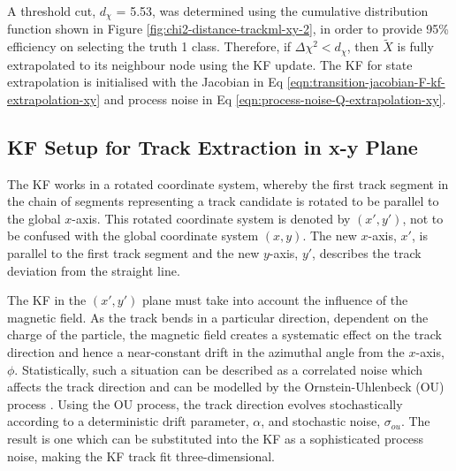 A threshold cut, $d_{\chi}$ = 5.53, was determined using the cumulative distribution function shown in Figure \ref{fig:chi2-distance-trackml-xy-2}, in order to provide 95\% efficiency on selecting the truth 1 class. Therefore, if $\Delta \chi^{2} < d_{\chi}$, then $\tilde{X}$ is fully extrapolated to its neighbour node using the KF update. The KF for state extrapolation is initialised with the Jacobian in Eq \eqref{eqn:transition-jacobian-F-kf-extrapolation-xy} and process noise in Eq \eqref{eqn:process-noise-Q-extrapolation-xy}.









\clearpage
\subsection{KF Setup for Track Extraction in x-y Plane}
\label{chapter-6-derivation-part-2}

The KF works in a rotated coordinate system, whereby the first track segment in the chain of segments representing a track candidate is rotated to be parallel to the global $x$-axis. This rotated coordinate system is denoted by $(x', y')$, not to be confused with the global coordinate system $(x, y)$. The new $x$-axis, $x'$, is parallel to the first track segment and the new $y$-axis, $y'$, describes the track deviation from the straight line.

The KF in the $(x', y')$ plane must take into account the influence of the magnetic field. As the track bends in a particular direction, dependent on the charge of the particle, the magnetic field creates a systematic effect on the track direction and hence a near-constant drift in the azimuthal angle from the $x$-axis, $\phi$. Statistically, such a situation can be described as a correlated noise which affects the track direction and can be modelled by the Ornstein-Uhlenbeck (OU) process \cite{OU}. Using the OU process, the track direction evolves stochastically according to a deterministic drift parameter, $\alpha$, and stochastic noise, $\sigma_{ou}$. The result is one which can be substituted into the KF as a sophisticated process noise, making the KF track fit three-dimensional.

